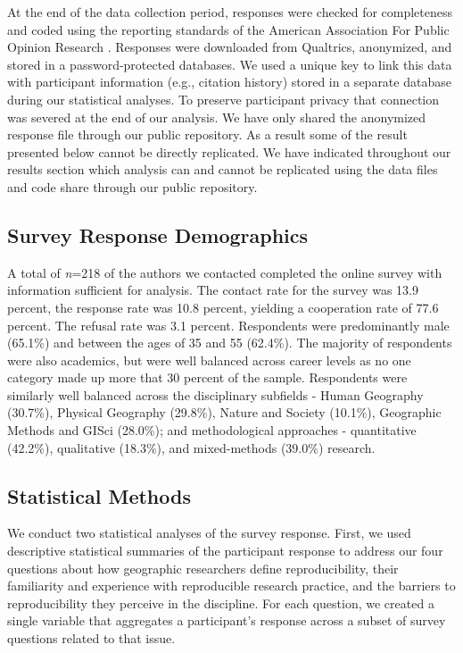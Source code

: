\documentclass[]{interact}
\theoremstyle{plain}%
\theoremstyle{definition}
\theoremstyle{remark}
\begin{document}
At the end of the data collection period, responses were checked for completeness and coded using the reporting standards of the American Association For Public Opinion Research \citep{aaporstandards}.
Responses were downloaded from Qualtrics, anonymized, and stored in a password-protected databases.
We used a unique key to link this data with participant information (e.g., citation history) stored in a separate database during our statistical analyses. 
To preserve participant privacy that connection was severed at the end of our analysis.
We have only shared the anonymized response file through our public repository. 
As a result some of the result presented below cannot be directly replicated. 
We have indicated throughout our results section which analysis can and cannot be replicated using the data files and code share through our public repository. 

\subsection*{Survey Response Demographics}
A total of \textit{n}=218 of the authors we contacted completed the online survey with information sufficient for analysis. 
The contact rate for the survey was 13.9 percent, the response rate was 10.8 percent, yielding a cooperation rate of 77.6 percent. 
The refusal rate was 3.1 percent.
Respondents were predominantly male (65.1\%) and between the ages of 35 and 55 (62.4\%). 
The majority of respondents were also academics, but were well balanced across career levels as no one category made up more that 30 percent of the sample.
Respondents were similarly well balanced across the disciplinary subfields - Human Geography (30.7\%), Physical Geography (29.8\%), Nature and Society (10.1\%), Geographic Methods and GISci (28.0\%); and methodological approaches - quantitative (42.2\%), qualitative (18.3\%), and mixed-methods (39.0\%) research.

\newpage

\subsection*{Statistical Methods}
We conduct two statistical analyses of the survey response. 
First, we used descriptive statistical summaries of the participant response to address our four questions about how geographic researchers define reproducibility, their familiarity and experience with reproducible research practice, and the barriers to reproducibility they perceive in the discipline.
For each question, we created a single variable that aggregates a participant's response across a subset of survey questions related to that issue.
\end{document}
